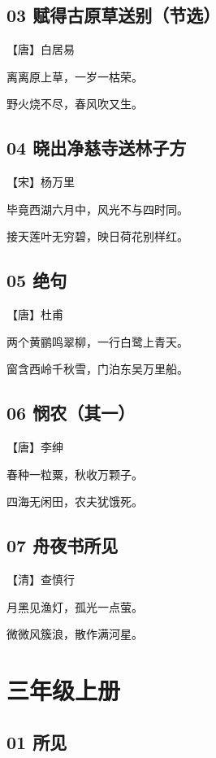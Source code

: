 \documentclass[12pt]{article}
\begin{document}
\subsection*{03 赋得古原草送别（节选）}

【唐】白居易

离离原上草，一岁一枯荣。

野火烧不尽，春风吹又生。

\subsection*{04 晓出净慈寺送林子方}

【宋】杨万里

毕竟西湖六月中，风光不与四时同。

接天莲叶无穷碧，映日荷花别样红。

\subsection*{05 绝句}

【唐】杜甫

两个黄鹂鸣翠柳，一行白鹭上青天。

窗含西岭千秋雪，门泊东吴万里船。

\subsection*{06 悯农（其一）}

【唐】李绅

春种一粒粟，秋收万颗子。

四海无闲田，农夫犹饿死。

\subsection*{07 舟夜书所见}

【清】查慎行

月黑见渔灯，孤光一点萤。

微微风簇浪，散作满河星。

\newpage

\section*{三年级上册}

\subsection*{01 所见}
\end{document}
